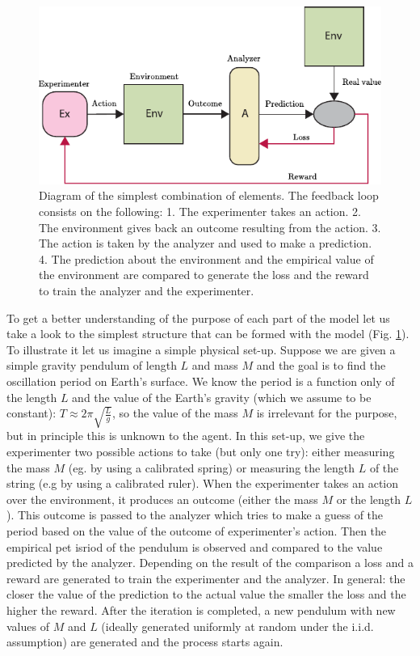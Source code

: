 \documentclass[11pt,a4paper,twoside]{report}
\newcommand{\+}{\textnormal{+} }
\theoremstyle{definition}
\numberwithin{equation}{chapter}
\begin{document}
\begin{figure}
  \centering
  \includegraphics{figures/SimpleSetUp.pdf}
  \caption{Diagram of the simplest combination of elements. The feedback loop
  consists on the following: 1. The experimenter takes an action. 2. The
  environment gives back an outcome resulting from the action. 3. The action is
  taken by the analyzer and used to make a prediction. 4. The prediction about
  the environment and the empirical value of the environment are compared to
  generate the loss and the reward to train the analyzer and the experimenter.}
  \label{fig:simplesetup}
\end{figure}

To get a better understanding of the purpose of each part of the model let us
take a look to the simplest structure that can be formed with the model (Fig.
\ref{fig:simplesetup}). To illustrate it let us imagine a simple physical
set-up. Suppose we are given a simple gravity pendulum of length $L$ and mass
$M$ and the goal is to find the oscillation period on Earth's surface. We know
the period is a function only of the length $L$ and the value of the Earth's
gravity (which we assume to be constant): $T \approx 2\pi\sqrt{\frac{L}{g}}$, so
the value of the mass $M$ is irrelevant for the purpose, but in principle this
is unknown to the agent. In this set-up, we give the experimenter two possible
actions to take (but only one try): either measuring the mass $M$ (eg. by using
a calibrated spring) or measuring the length $L$ of the string (e.g by using a
calibrated ruler). When the experimenter takes an action over the environment,
it produces an outcome (either the mass $M$ or the length $L$). This outcome is
passed to the analyzer which tries to make a guess of the period based on the
value of the outcome of experimenter's action. Then the empirical pet isriod of
the pendulum is observed and compared to the value predicted by the analyzer.
Depending on the result of the comparison a loss and a reward are generated to
train the experimenter and the analyzer. In general: the closer the value of the
prediction to the actual value the smaller the loss and the higher the reward.
After the iteration is completed, a new pendulum with new values of $M$ and $L$
(ideally generated uniformly at random under the i.i.d. assumption) are
generated and the process starts again.
\end{document}
